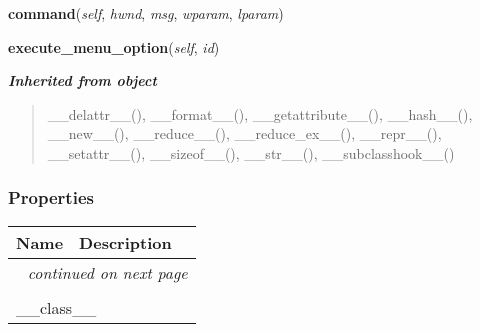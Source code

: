 \hspace{.8\funcindent}\begin{boxedminipage}{\funcwidth}

    \raggedright \textbf{command}(\textit{self}, \textit{hwnd}, \textit{msg}, \textit{wparam}, \textit{lparam})

\setlength{\parskip}{2ex}
\setlength{\parskip}{1ex}
    \end{boxedminipage}

    \label{lib:tray:SysTrayIcon:execute_menu_option}

    \vspace{0.5ex}

\hspace{.8\funcindent}\begin{boxedminipage}{\funcwidth}

    \raggedright \textbf{execute\_menu\_option}(\textit{self}, \textit{id})

\setlength{\parskip}{2ex}
\setlength{\parskip}{1ex}
    \end{boxedminipage}


\large{\textbf{\textit{Inherited from object}}}

\begin{quote}
\_\_delattr\_\_(), \_\_format\_\_(), \_\_getattribute\_\_(), \_\_hash\_\_(), \_\_new\_\_(), \_\_reduce\_\_(), \_\_reduce\_ex\_\_(), \_\_repr\_\_(), \_\_setattr\_\_(), \_\_sizeof\_\_(), \_\_str\_\_(), \_\_subclasshook\_\_()
\end{quote}


  \subsubsection{Properties}

    \vspace{-1cm}
\hspace{\varindent}\begin{longtable}{|p{\varnamewidth}|p{\vardescrwidth}|l}
\cline{1-2}
\cline{1-2} \centering \textbf{Name} & \centering \textbf{Description}& \\
\cline{1-2}
\endhead\cline{1-2}\multicolumn{3}{r}{\small\textit{continued on next page}}\\\endfoot\cline{1-2}
\endlastfoot\multicolumn{2}{|l|}{\textit{Inherited from object}}\\
\multicolumn{2}{|p{\varwidth}|}{\raggedright \_\_class\_\_}\\
\cline{1-2}
\end{longtable}


